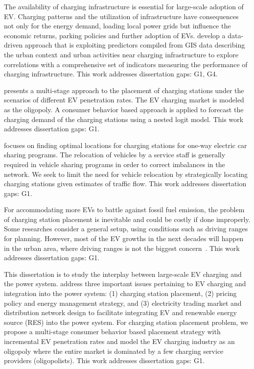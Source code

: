 \documentclass[letterpaper, 12pt, oneside, doublespacing]{Thesis}
\begin{document}
\noindent The availability of charging infrastructure is essential for large-scale adoption of EV. Charging patterns and the utilization of infrastructure have consequences not only for the energy demand, loading local power grids but influence the economic returns, parking policies and further adoption of EVs. \cite{predicting_popularity_2019} develop a data-driven approach that is exploiting predictors compiled from GIS data describing the urban context and urban activities near charging infrastructure to explore correlations with a comprehensive set of indicators measuring the performance of charging infrastructure. This work addresses dissertation gaps: G1, G4.



\noindent \cite{a_consumer_2018} presents a multi-stage approach to the placement of charging stations under the scenarios of different EV penetration rates. The EV charging market is modeled as the oligopoly. A consumer behavior based approach is applied to forecast the charging demand of the charging stations using a nested logit model. This work addresses dissertation gaps: G1.



\noindent \cite{charging_station_2018} focuses on finding optimal locations for charging stations for one-way electric car sharing programs. The relocation of vehicles by a service staff is generally required in vehicle sharing programs in order to correct imbalances in the network. We seek to limit the need for vehicle relocation by strategically locating charging stations given estimates of traffic flow. This work addresses dissertation gaps: G1.



\noindent For accommodating more EVs to battle against fossil fuel emission, the problem of charging station placement is inevitable and could be costly if done improperly. Some researches consider a general setup, using conditions such as driving ranges for planning. However, most of the EV growths in the next decades will happen in the urban area, where driving ranges is not the biggest concern~\cite{electric_vehicle_2018}. This work addresses dissertation gaps: G1.



\noindent This dissertation is to study the interplay between large-scale EV charging and the power system. \cite{a_consumer_2018} address three important issues pertaining to EV charging and integration into the power system: (1) charging station placement, (2) pricing policy and energy management strategy, and (3) electricity trading market and distribution network design to facilitate integrating EV and renewable energy source (RES) into the power system. For charging station placement problem, we propose a multi-stage consumer behavior based placement strategy with incremental EV penetration rates and model the EV charging industry as an oligopoly where the entire market is dominated by a few charging service providers (oligopolists). This work addresses dissertation gaps: G1.
\end{document}
